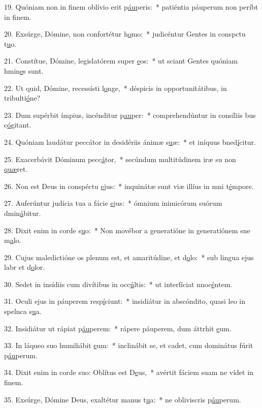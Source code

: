 19. Quóniam non in finem oblívio erit p\uline{áu}peris:~* patiéntia páuperum non períbt in f\uline{i}nem.\par 
20. Exsúrge, Dómine, non confortétur h\uline{o}mo:~* judicéntur Gentes in conspctu t\uline{u}o.\par 
21. Constítue, Dómine, legislatórem super \uline{e}os:~* ut sciant Gentes quóniam hmin\uline{e}s sunt.\par 
22. Ut quid, Dómine, recessísti l\uline{o}nge,~* déspicis in opportunitátibus, in tribulti\uline{ó}ne?\par 
23. Dum supérbit ímpius, incénditur p\uline{au}per:~* comprehendúntur in consíliis bus c\uline{ó}gitant.\par 
24. Quóniam laudátur peccátor in desidériis ánimæ s\uline{u}æ:~* et iníquus bned\uline{í}citur.\par 
25. Exacerbávit Dóminum pecc\uline{á}tor,~* secúndum multitúdinem iræ su non \uline{quæ}ret.\par 
26. Non est Deus in conspéctu \uline{e}jus:~* inquinátæ sunt viæ illíus in mni t\uline{é}mpore.\par 
27. Auferúntur judícia tua a fácie \uline{e}jus:~* ómnium inimicórum suórum dmin\uline{á}bitur.\par 
28. Dixit enim in corde s\uline{u}o:~* Non movébor a generatióne in generatiónem sne m\uline{a}lo.\par 
29. Cujus maledictióne os plenum est, et amaritúdine, et d\uline{o}lo:~* sub lingua ejus labr et d\uline{o}lor.\par 
30. Sedet in insídiis cum divítibus in occ\uline{ú}ltis:~* ut interfíciat nnoc\uline{é}ntem.\par 
31. Oculi ejus in páuperem resp\uline{í}ciunt:~* insidiátur in abscóndito, quasi leo in spelnca s\uline{u}a.\par 
32. Insidiátur ut rápiat p\uline{áu}perem:~* rápere páuperem, dum áttrhit \uline{e}um.\par 
33. In láqueo suo humiliábit \uline{e}um:~* inclinábit se, et cadet, cum dominátus fúrit p\uline{áu}perum.\par 
34. Dixit enim in corde suo: Oblítus est D\uline{e}us,~* avértit fáciem suam ne vídet in f\uline{i}nem.\par 
35. Exsúrge, Dómine Deus, exaltétur manus t\uline{u}a:~* ne obliviscris p\uline{áu}perum.\par 
